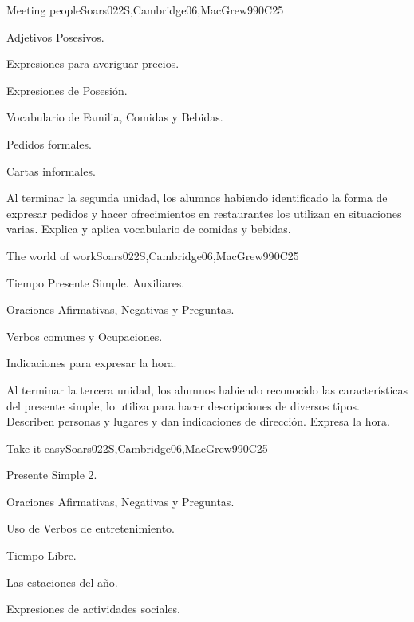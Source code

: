 \begin{syllabus}
\begin{unit}{Meeting people}{}{Soars022S,Cambridge06,MacGrew99}{0}{C25}
   \begin{topics}
      \item Adjetivos Posesivos.
      \item Expresiones para averiguar precios.
      \item Expresiones de Posesión.
      \item Vocabulario de Familia, Comidas y Bebidas.
      \item Pedidos formales.
      \item Cartas informales.
   \end{topics}

   \begin{learningoutcomes}
      \item Al terminar la segunda unidad, los alumnos habiendo identificado la forma de expresar pedidos y hacer ofrecimientos en restaurantes los utilizan en situaciones varias. Explica y aplica vocabulario de comidas y bebidas.  
   \end{learningoutcomes}

\end{unit}

\begin{unit}{The world of work}{}{Soars022S,Cambridge06,MacGrew99}{0}{C25}
   \begin{topics}
      \item Tiempo Presente Simple. Auxiliares.
      \item Oraciones Afirmativas, Negativas y Preguntas.
      \item Verbos comunes y Ocupaciones.
      \item Indicaciones para expresar la hora.
   \end{topics}

   \begin{learningoutcomes}
      \item Al terminar la tercera unidad, los alumnos habiendo reconocido las características  del presente simple, lo utiliza para hacer descripciones de diversos tipos. Describen personas y lugares y dan indicaciones de dirección. Expresa la hora. 
   \end{learningoutcomes}

\end{unit}

\begin{unit}{Take it easy}{}{Soars022S,Cambridge06,MacGrew99}{0}{C25}
   \begin{topics}
      \item Presente Simple 2.
      \item Oraciones Afirmativas, Negativas y Preguntas.
      \item Uso de Verbos de entretenimiento.
      \item Tiempo Libre.
      \item Las estaciones del año.
      \item Expresiones de actividades sociales.
   \end{topics}


\end{unit}
\end{syllabus}
